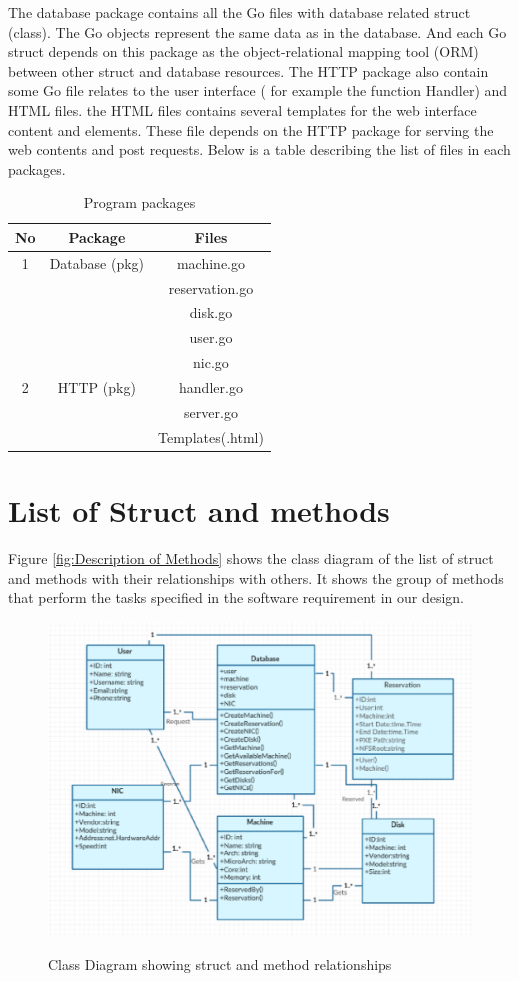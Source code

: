 The database package contains all the Go files with database related struct (class). The Go objects represent the same data as in the database. And each Go struct depends on this package as the object-relational mapping tool (ORM) between other struct and database resources. The HTTP package also contain some Go file relates to the user interface ( for example the function Handler) and HTML files. the HTML files contains several templates for the web interface content and elements. These file depends on the HTTP package for serving the web contents and post requests. Below is a table describing the list of files in each packages.
\pagebreak
\begin{table}[h!]
  \centering
  \label{tab:table1}
  \begin{tabular}{ccc}
    \hline
    No & Package & Files\\
   \hline
    1 &Database (pkg)& machine.go\\
       &&reservation.go\\
      &&disk.go\\
      &&user.go\\
      &&nic.go\\
    \hline
    2 &HTTP (pkg)& handler.go\\
    &&server.go\\
    &&Templates(.html)\\
    \hline
  \end{tabular}
  \caption{Program packages}
\end{table}

\section{List of Struct and methods}
Figure \autoref{fig:Description of Methods} shows the class diagram of the list of struct and methods with their relationships with others. It shows the group of methods that perform the tasks specified in the software requirement in our design.
\begin{figure}[h!]
\includegraphics[width = \linewidth]{methods.eps}
\label{fig:Description of Methods} 
\caption{Class Diagram showing struct and method relationships}
\end{figure}
\pagebreak
